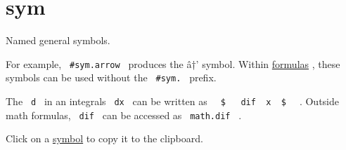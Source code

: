 \section{sym}\label{sym}

Named general symbols.

For example, \texttt{\ \#sym.arrow\ } produces the â†' symbol. Within
\href{/docs/reference/math/}{formulas} , these symbols can be used
without the \texttt{\ \#sym.\ } prefix.

The \texttt{\ d\ } in an integral\textquotesingle s \texttt{\ dx\ } can
be written as
\texttt{\ }{\texttt{\ \$\ }}\texttt{\ }{\texttt{\ dif\ }}\texttt{\ x\ }{\texttt{\ \$\ }}\texttt{\ }
. Outside math formulas, \texttt{\ dif\ } can be accessed as
\texttt{\ math.dif\ } .

Click on a \href{/docs/reference/symbols/symbol/}{symbol} to copy it to
the clipboard.



